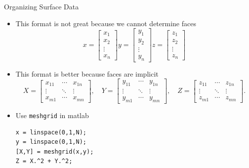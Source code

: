 \documentclass[10pt]{beamer}
\begin{document}
\begin{frame}[fragile]{Organizing Surface Data}


\begin{itemize}
    \item This format is not great because we cannot determine faces 
       \[
    x=
\begin{bmatrix}
x_1 \\
x_2 \\
\vdots \\
x_n 
\end{bmatrix}
    y=
\begin{bmatrix}
y_1\\
y_2\\
\vdots \\
y_n 
\end{bmatrix}
    z=
\begin{bmatrix}
z_1 \\
z_2 \\
\vdots \\
z_n
\end{bmatrix}
\]

    \item This format is better because faces are implicit
\[
X=
\begin{bmatrix}
x_{11} & \cdots & x_{1n}\\
\vdots & \ddots & \vdots\\
x_{m1} & \cdots & x_{mn}
\end{bmatrix},
\quad
Y=
\begin{bmatrix}
y_{11} & \cdots & y_{1n}\\
\vdots & \ddots & \vdots\\
y_{m1} & \cdots & y_{mn}
\end{bmatrix},
\quad
Z=
\begin{bmatrix}
z_{11} & \cdots & z_{1n}\\
\vdots & \ddots & \vdots\\
z_{m1} & \cdots & z_{mn}
\end{bmatrix}.
\]
    \item Use \texttt{meshgrid} in matlab
\begin{lstlisting}
x = linspace(0,1,N);
y = linspace(0,1,N);
[X,Y] = meshgrid(x,y);
Z = X.^2 + Y.^2;
\end{lstlisting}

\end{itemize}

\end{frame}

\end{document}
